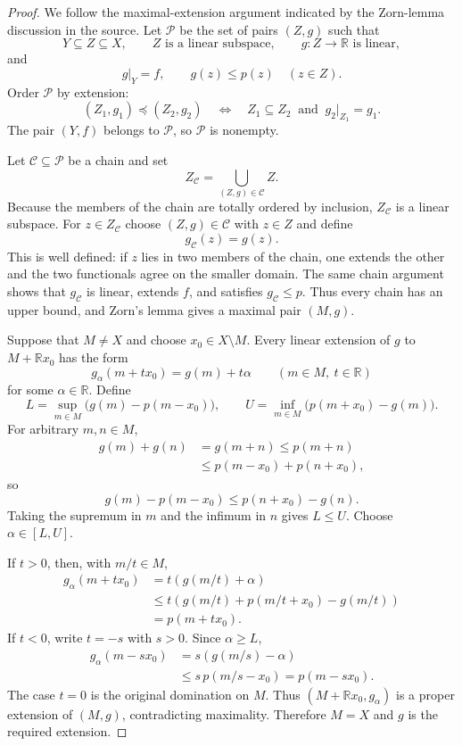 \begin{proof}
We follow the maximal-extension argument indicated by the Zorn-lemma
discussion in the source.  Let $\mathscr P$ be the set of pairs $(Z,g)$ such
that
\[
  Y\subseteq Z\subseteq X,\qquad
  Z\text{ is a linear subspace},\qquad
  g\colon Z\to\mathbb R\text{ is linear},
\]
and
\[
  g|_Y=f,\qquad g(z)\le p(z)\quad(z\in Z).
\]
Order $\mathscr P$ by extension:
\[
  (Z_1,g_1)\preccurlyeq(Z_2,g_2)
  \quad\Longleftrightarrow\quad
  Z_1\subseteq Z_2\ \text{ and }\ g_2|_{Z_1}=g_1.
\]
The pair $(Y,f)$ belongs to $\mathscr P$, so $\mathscr P$ is nonempty.

Let $\mathscr C\subseteq\mathscr P$ be a chain and set
\[
  Z_{\mathscr C}=\bigcup_{(Z,g)\in\mathscr C}Z.
\]
Because the members of the chain are totally ordered by inclusion,
$Z_{\mathscr C}$ is a linear subspace.  For $z\in Z_{\mathscr C}$ choose
$(Z,g)\in\mathscr C$ with $z\in Z$ and define
\[
  g_{\mathscr C}(z)=g(z).
\]
This is well defined: if $z$ lies in two members of the chain, one extends
the other and the two functionals agree on the smaller domain.  The same
chain argument shows that $g_{\mathscr C}$ is linear, extends $f$, and
satisfies $g_{\mathscr C}\le p$.  Thus every chain has an upper bound, and
Zorn's lemma gives a maximal pair $(M,g)$.

Suppose that $M\ne X$ and choose $x_0\in X\setminus M$.  Every linear
extension of $g$ to $M+\mathbb R x_0$ has the form
\[
  g_\alpha(m+t x_0)=g(m)+t\alpha
  \qquad(m\in M,\ t\in\mathbb R)
\]
for some $\alpha\in\mathbb R$.  Define
\[
  L=\sup_{m\in M}\bigl(g(m)-p(m-x_0)\bigr),
  \qquad
  U=\inf_{m\in M}\bigl(p(m+x_0)-g(m)\bigr).
\]
For arbitrary $m,n\in M$,
\[
\begin{aligned}
  g(m)+g(n)
   &=g(m+n)
    \le p(m+n)\\
   &\le p(m-x_0)+p(n+x_0),
\end{aligned}
\]
so
\[
  g(m)-p(m-x_0)\le p(n+x_0)-g(n).
\]
Taking the supremum in $m$ and the infimum in $n$ gives $L\le U$.  Choose
$\alpha\in[L,U]$.

If $t>0$, then, with $m/t\in M$,
\[
\begin{aligned}
  g_\alpha(m+t x_0)
   &=t\left(g(m/t)+\alpha\right)\\
   &\le t\left(g(m/t)+p(m/t+x_0)-g(m/t)\right)\\
   &=p(m+t x_0).
\end{aligned}
\]
If $t<0$, write $t=-s$ with $s>0$.  Since $\alpha\ge L$,
\[
\begin{aligned}
  g_\alpha(m-sx_0)
   &=s\left(g(m/s)-\alpha\right)\\
   &\le s\,p(m/s-x_0)
    =p(m-sx_0).
\end{aligned}
\]
The case $t=0$ is the original domination on $M$.  Thus
$(M+\mathbb R x_0,g_\alpha)$ is a proper extension of $(M,g)$, contradicting
maximality.  Therefore $M=X$ and $g$ is the required extension.
\end{proof}

